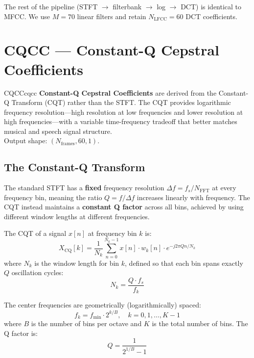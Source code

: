 \documentclass[12pt]{report}
\begin{document}
The rest of the pipeline (STFT $\to$ filterbank $\to$ log $\to$ DCT) is identical to MFCC.
We use $M = 70$ linear filters and retain $N_\text{LFCC} = 60$ DCT coefficients.


\section{CQCC --- Constant-Q Cepstral Coefficients}

\begin{dfnbox}{CQCC}{cqcc}
    \textbf{Constant-Q Cepstral Coefficients} are derived from the Constant-Q Transform (CQT)
    rather than the STFT. The CQT provides logarithmic frequency resolution---high resolution
    at low frequencies and lower resolution at high frequencies---with a variable time-frequency
    tradeoff that better matches musical and speech signal structure. \\
    Output shape: $(N_\text{frames}, 60, 1)$.
\end{dfnbox}

\subsection{The Constant-Q Transform}

The standard STFT has a \textbf{fixed} frequency resolution $\Delta f = f_s / N_\text{FFT}$
at every frequency bin, meaning the ratio $Q = f / \Delta f$ increases linearly with frequency.
The CQT instead maintains a \textbf{constant Q factor} across all bins, achieved by using
different window lengths at different frequencies.

The CQT of a signal $x[n]$ at frequency bin $k$ is:
\begin{equation}
    X_\text{CQ}[k] = \frac{1}{N_k} \sum_{n=0}^{N_k - 1} x[n] \cdot w_k[n] \cdot e^{-j 2\pi Q n / N_k}
\end{equation}
where $N_k$ is the window length for bin $k$, defined so that each bin spans exactly $Q$
oscillation cycles:
\begin{equation}
    N_k = \frac{Q \cdot f_s}{f_k}
\end{equation}

The center frequencies are geometrically (logarithmically) spaced:
\begin{equation}
    f_k = f_\text{min} \cdot 2^{k/B}, \quad k = 0, 1, \ldots, K-1
\end{equation}
where $B$ is the number of bins per octave and $K$ is the total number of bins. The Q factor is:
\begin{equation}
    Q = \frac{1}{2^{1/B} - 1}
\end{equation}
\end{document}
